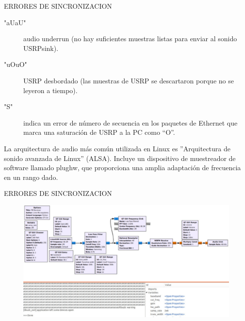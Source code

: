 \begin{frame}{ERRORES DE SINCRONIZACION}

\begin{description}


\item["aUaU"]audio underrun (no hay suficientes muestras listas para enviar al sonido USRPsink).\\ \vspace{2mm}
\item["uOuO"]USRP desbordado (las muestras de USRP se descartaron porque no se leyeron a tiempo). \\ \vspace{2mm}
\item["S"] indica un error de número de secuencia en los paquetes de Ethernet que marca una saturación de USRP a la PC como “O”.\\ \vspace{2mm}


\end{description}

La arquitectura de audio más común utilizada en Linux es ”Arquitectura de sonido avanzada de Linux” (ALSA). Incluye un dispositivo de muestreador de software llamado plughw, que proporciona una amplia adaptación de frecuencia en un rango dado.\\ \vspace{2mm}

\end{frame}
\begin{frame}{ERRORES DE SINCRONIZACION}

\begin{figure}
\begin{center}
\vspace{-8mm}
\includegraphics[width=\textwidth, height=0.6\paperheight]{parte1/lab4/pdf/aUaU.pdf}
\end{center}
\end{figure}
\vspace{-5mm}


\end{frame}
